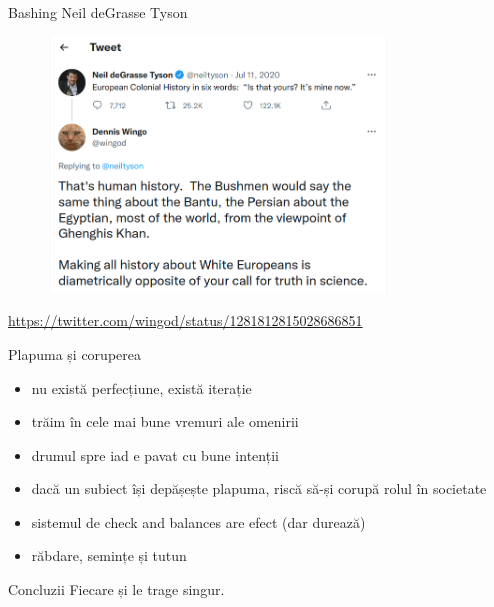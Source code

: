 \documentclass{simple}
\begin{document}
\begin{frame}{Bashing Neil deGrasse Tyson}
  \begin{figure}
    \centering
    \pause
    \includegraphics[width=0.8\textwidth]{img/neil-degrasse-tyson-wingod.png}
  \end{figure}
  \begin{center}
    \tiny
    \url{https://twitter.com/wingod/status/1281812815028686851}
  \end{center}
\end{frame}

\begin{frame}{Plapuma și coruperea}
  \begin{itemize}
    \pause \item nu există perfecțiune, există iterație
    \pause \item trăim în cele mai bune vremuri ale omenirii
    \pause \item drumul spre iad e pavat cu bune intenții
    \pause \item dacă un subiect își depășește plapuma, riscă să-și corupă rolul în societate
    \pause \item sistemul de check and balances are efect (dar durează)
    \pause \item răbdare, semințe și tutun
  \end{itemize}
\end{frame}

\begin{frame}{Concluzii}
  \centering
  \pause
  \LARGE{Fiecare și le trage singur.}
\end{frame}
\end{document}
